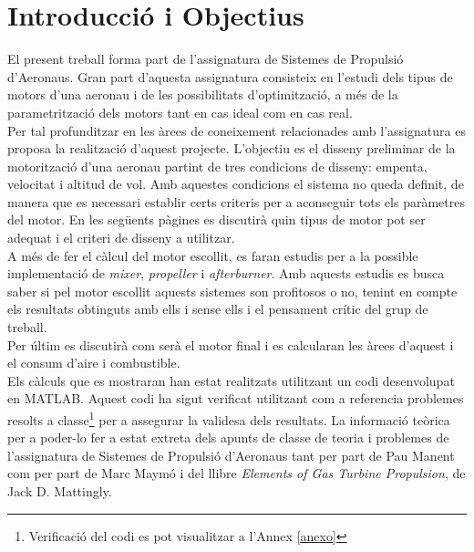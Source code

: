\section{Introducció i Objectius}
El present treball forma part de l'assignatura de Sistemes de Propulsió d'Aeronaus. Gran part d'aquesta assignatura consisteix en l'estudi dels tipus de motors d'una aeronau i de les possibilitats d'optimització, a més de la parametrització dels motors tant en cas ideal com en cas real.\\
Per tal profunditzar en les àrees de coneixement relacionades amb l'assignatura es proposa la realització d'aquest projecte. L'objectiu es el disseny preliminar de la motorització d'una aeronau partint de tres condicions de disseny: empenta, velocitat i altitud de vol. Amb aquestes condicions el sistema no queda definit, de manera que es necessari establir certs criteris per a aconseguir tots els paràmetres del motor. En les següents pàgines es discutirà quin tipus de motor pot ser adequat i el criteri de disseny a utilitzar.\\
A més de fer el càlcul del motor escollit, es faran estudis per a la possible implementació de \textit{mixer}, \textit{propeller} i \textit{afterburner}. Amb aquests estudis es busca saber si pel motor escollit aquests sistemes son profitosos o no, tenint en compte els resultats obtinguts amb ells i sense ells i el pensament crític del grup de treball.\\
Per últim es discutirà com serà el motor final i es calcularan les àrees d'aquest i el consum d'aire i combustible.\\
Els càlculs que es mostraran han estat realitzats utilitzant un codi desenvolupat en MATLAB. Aquest codi ha sigut verificat utilitzant com a referencia problemes resolts a classe\footnote{Verificació del codi es pot visualitzar a l'Annex \ref{anexo}} per a assegurar la validesa dels resultats. La informació teòrica per a poder-lo fer a estat extreta dels apunts de classe de teoria i problemes de l'assignatura de Sistemes de Propulsió d'Aeronaus tant per part de Pau Manent com per part de Marc Maymó i del llibre \textit{Elements of Gas Turbine Propulsion}, de Jack D. Mattingly. 